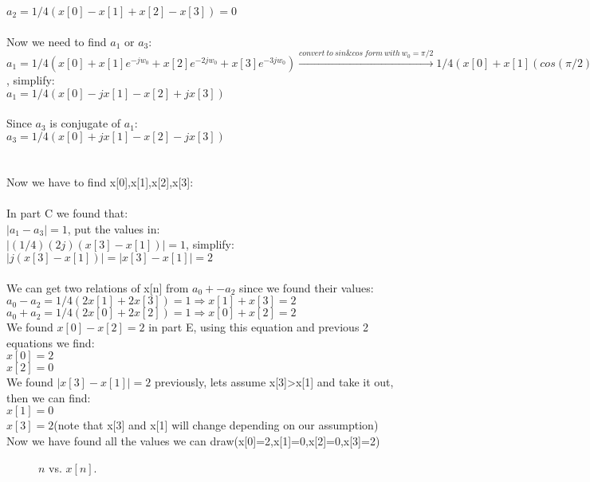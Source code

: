 \documentclass[10pt,a4paper, margin=1in]{article}
\begin{document}
\begin{enumerate}
$a_2=1/4(x[0]-x[1]+x[2]-x[3])= 0$\\
\\
Now we need to find $a_1$ or $a_3$:\\
$a_1=1/4(x[0]+x[1]e^{-jw_0}+x[2]e^{-2jw_0}+x[3]e^{-3jw_0}) \xrightarrow{convert\ to\ sin\& cos\ form\ with\ w_0=\pi/2} 1/4(x[0]+x[1](cos(\pi/2)-jsin(\pi/2))  +x[2](cos(2\pi/2)-jsin(2\pi/2))  +x[3](cos(3\pi/2)-jsin(3\pi/2)))$, simplify:\\
$a_1=1/4(x[0]-jx[1]-x[2]+jx[3])$\\
\\
Since $a_3$ is conjugate of $a_1$:\\
$a_3=1/4(x[0]+jx[1]-x[2]-jx[3])$\\
\\ \\
Now we have to find x[0],x[1],x[2],x[3]:\\
\\
In part C we found that:\\
$|a_1-a_3|=1$, put the values in:\\
$|(1/4)(2j)(x[3]-x[1])|=1$, simplify:\\
$|j(x[3]-x[1])|= |x[3]-x[1]|=2$\\
\\
We can get two relations of x[n] from $a_0+-a_2$ since we found their values:\\
$a_0-a_2=1/4(2x[1]+2x[3])=1 \Longrightarrow x[1]+x[3]=2$\\
$a_0+a_2=1/4(2x[0]+2x[2])=1 \Longrightarrow x[0]+x[2]=2$\\
We found $ x[0]-x[2]=2 $ in part E, using this equation and previous 2 equations we find:\\
$x[0]=2 $\\
$x[2]=0$\\
We found $|x[3]-x[1]|=2$ previously, lets assume x[3]>x[1] and take it out, then we can find:\\
$x[1]=0$\\
$x[3]=2$(note that x[3] and x[1] will change depending on our assumption)\\
Now we have found all the values we can draw(x[0]=2,x[1]=0,x[2]=0,x[3]=2)\\

        \begin{figure} [H]
    \centering
    \caption{$n$ vs. $x[n]$.}
    \label{fig:q2}
\end{figure}


\end{enumerate}
\end{document}
